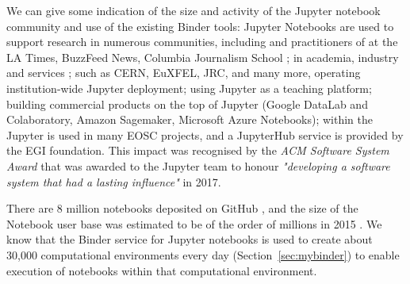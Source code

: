 We can give some indication of the size and activity of the Jupyter notebook
community and use of the existing Binder tools: Jupyter Notebooks are used to
support research in numerous communities, including
{} and practitioners of  at the LA Times, BuzzFeed News, Columbia Journalism School
  \cite{latimes-datadesk} \cite{columbia-nytimes} \cite{data-journalism};
   in academia, industry and services \cite{Perkel2018};
   such as CERN, EuXFEL, JRC, and many more,
  operating institution-wide Jupyter deployment;
   using Jupyter as a teaching platform;
   building commercial products on the
  top of Jupyter (Google DataLab and Colaboratory, Amazon Sagemaker, Microsoft Azure
  Notebooks);
  within the  Jupyter is used in many EOSC
  projects, and a JupyterHub service is provided by the EGI foundation.
  This impact was recognised by the
  \emph{ACM Software System Award} that was awarded to the Jupyter team to
  honour \emph{"developing a software system that had a lasting influence"} in
  2017.
  
  There are 8 million notebooks deposited on GitHub \cite{notebookcount}, and
  the size of the Notebook user base was estimated to be of the order of
  millions in 2015 \cite{jupyter-grant}. We know that the Binder service for
  Jupyter notebooks is used to create about 30,000 computational environments
  every day (Section~\ref{sec:mybinder}) to enable execution of notebooks within
  that computational environment.

